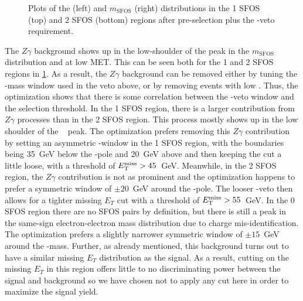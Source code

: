 \begin{figure}[ht!]
\caption{Plots of the \MET (left) and $m_{\textrm{SFOS}}$ (right) distributions 
in the 1 SFOS (top) and 2 SFOS (bottom) regions after pre-selection
plus the \bee-veto requirement.}
\label{fig:met_zwindow_optimization}
\end{figure}

The $Z\gamma$ background shows up in the low-shoulder of the \z peak
in the $m_{\textrm{SFOS}}$ distribution and at low MET. This can be
seen both for the 1 and 2 SFOS regions in \fig\ref{fig:met_zwindow_optimization}.
As a result, the $Z\gamma$ background can be removed either by tuning 
the \z-mass window used in the veto above, or by removing events with low \met.
Thus, the optimization shows that there is some correlation 
between the \z-veto window and the \met selection threshold. 
In the 1 SFOS region, there is a larger 
contribution from $Z\gamma$ processes than in the 2 SFOS
region.  This process mostly shows up in the low shoulder 
of the \z~ peak. The optimization
prefers removing this $Z\gamma$ contribution by setting an 
asymmetric \z-window in the 1 SFOS
region, with the boundaries being 35~GeV below the \z-pole 
and 20~GeV above and then keeping the \MET cut a little loose, with a 
threshold of $E_{\mathrm{T}}^{\mathrm{miss}} > 45$~GeV.  Meanwhile, in the 2 SFOS region,
the $Z\gamma$ contribution is not as prominent and the 
optimization happens to prefer a symmetric
window of $\pm20$~GeV around the \z-pole.  
The looser \z-veto then allows for a tighter
missing $E_{T}$ cut with a threshold of $E_{\mathrm{T}}^{\mathrm{miss}} > 55$~GeV. 
In the 0 SFOS region there 
are no SFOS pairs by definition,
but there is still a peak in the same-sign electron-electron mass 
distribution due to charge mis-identification.
The optimization prefers a slightly narrower symmetric window 
of $\pm15$~GeV around the \z-mass. 
Further, as already mentioned,
this background turns out 
to have a similar missing $E_{T}$ distribution
as the signal. As a result, cutting on the missing $E_{T}$ in this region 
offers little to no discriminating power
between the signal and background so we have chosen not to apply 
any cut here in order to maximize the signal yield.


